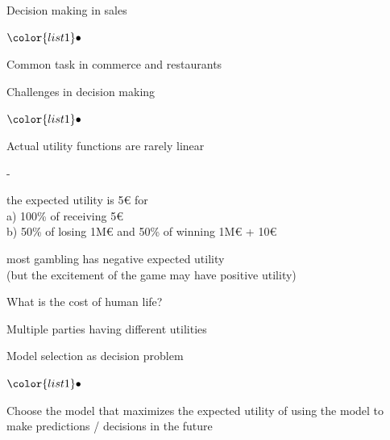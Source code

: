 \documentclass[t]{beamer}
\newenvironment{list1}{
   \begin{list}{$\color{list1}\bullet$}{\itemsep=6pt}}{
  \end{list}}
\newenvironment{list2}{
  \begin{list}{-}{\baselineskip=12pt\itemsep=2pt}}{
  \end{list}}
\begin{document}
\begin{frame}{Decision making in sales}

  \begin{list1}
    \item Common task in commerce and restaurants
  \end{list1}
  
\end{frame}  


\begin{frame}{Challenges in decision making}

  \begin{list1}
  \item Actual utility functions are rarely linear
    \begin{list2}
    \item<2-> the expected utility is 5€ for\\
      a) 100\% of receiving 5€\\
      b) 50\% of losing 1M€ and 50\% of winning 1M€ + 10€
    \item<3-> most gambling has negative expected utility\\
      (but the excitement of the game may have positive utility)
    \end{list2}
  \item<4-> What is the cost of human life?
  \item<5-> Multiple parties having different utilities
  \end{list1}
  
\end{frame}

\begin{frame}{Model selection as decision problem}

  \begin{list1}
  \item Choose the model that maximizes the expected utility of using
    the model to make predictions / decisions in the future
  \end{list1}

\end{frame}
\end{document}
